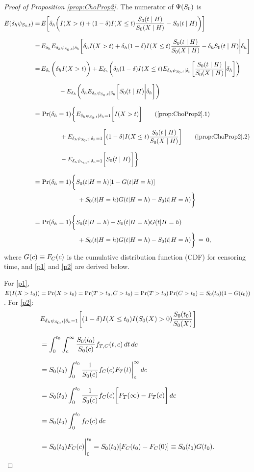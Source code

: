 {%
\newcommand{\termone}{I(X>t)}
\newcommand{\termtwo}{\omd I(X\leq t) \frac{\truesurv(t \mid H)}{\truesurv(X \mid H)}}
\newcommand{\termthree} {\truesurv(t \mid H)}
\newcommand{\estfunclongtrue}{\termone + \termtwo - \termthree}
\newcommand{\bigE}{E_{\unnormdirac\estfunctruesurvlabel\mid\unnormdirac}}
\newcommand{\bigEone}{E_{\unnormdirac\estfunctruesurvlabel\mid\unnormdirac = 1}}
\newcommand{\smallE}{E_{\unnormdirac}}
\begin{proof}[Proof of Proposition \ref{prop:ChoProp2}]
The numerator of $\Psi(S_0)$ is
\begin{align*}
E(\unnormdirac\estfunctruesurvlabel)
= &\,E\bigg[\unnormdirac \bigg( \estfunclongtrue\bigg)\bigg]  \eqnspace
= &\,\smallE \bigE\bigg[\unnormdirac \termone + \unnormdirac \termtwo - \unnormdirac \termthree \bigg| \unnormdirac \bigg]  \eqnspace
= &\,\smallE\bigg(\unnormdirac \termone \bigg) 
+ \smallE \bigg( \unnormdirac \omd I(X\leq t) \bigE \bigg[ \frac{\truesurv(t \mid H)}{\truesurv(X \mid H)} \bigg| \unnormdirac \bigg] \bigg) \eqnspace 
&\quad \quad \quad - \smallE \bigg(\unnormdirac \bigE \bigg[ \termthree\bigg|\unnormdirac\bigg]\bigg) \eqnspace
= &\,\Pr(\unnormdirac = 1) \bigg\{ 
\bigEone \bigg[ I(X>t) \bigg] \tag{\ref{prop:ChoProp2}.1} \label{p1} \eqnspace
&\,\quad \quad \quad + \bigEone \bigg[ \omd I(X\leq t) \frac{\truesurv(t \mid H)}{\truesurv(X \mid H)} \bigg] \tag{\ref{prop:ChoProp2}.2} \label{p2} \eqnspace
&\,\quad \quad \quad - \bigEone\bigg[ \termthree \bigg]
\bigg\} \eqnspace
=&\,\Pr(\unnormdirac = 1) \bigg\{ 
\truesurv(t|H=h)[1-G(t|H=h)] \\
&\quad \quad \quad \quad \quad \quad + \truesurv(t|H=h)G(t|H=h) - \truesurv(t|H=h)
\bigg\} \eqnspace
=&\,\Pr(\unnormdirac = 1) \bigg\{ 
\truesurv(t|H=h)-\truesurv(t|H=h)G(t|H=h) \\
&\quad \quad \quad \quad \quad \quad + \truesurv(t|H=h)G(t|H=h) - \truesurv(t|H=h)
\bigg\} \, = \,0,
\end{align*}
where $G(c) \equiv F_C(c)$ is the cumulative distribution function (CDF) for censoring time, and \cref{p1} and \cref{p2} are derived below. 
\newcommand{\tp}{t_0}

For \cref{p1}, $E(I(X>\tp)) = \Pr(X>\tp) = \Pr(T>\tp,C>\tp) = \Pr(T>\tp)\Pr(C>\tp) = \truesurv(\tp)(1-G(\tp))$. For \cref{p2}:
\begin{align*}
&\bigEone \bigg[(1-\delta) I(X\leq \tp)I(\truesurv(X)>0)\frac{\truesurv(\tp)}{\truesurv(X)}\bigg] \eqnspace 
&= \int_0^{\tp} \int_c^\infty \frac{\truesurv(\tp)}{\truesurv(c)} f_{T,C}(t,c)\,dt\,dc \eqnspace
&= \truesurv(\tp)\int_0^{\tp} \frac{1}{\truesurv(c)} f_{C}(c) F_T(t) \bigg|^\infty_c \,dc \eqnspace
&= \truesurv(\tp)\int_0^{\tp} 
\frac{1}{\truesurv(c)} f_{C}(c) \bigg[ F_T(\infty) - F_T(c) \bigg] \,dc \eqnspace
&= \truesurv(\tp)\int_0^{\tp} f_{C}(c) \,dc \eqnspace
&= \truesurv(\tp)F_{C}(c) \bigg|^{\tp}_0 = \truesurv(\tp)[F_C(\tp) - F_C(0)] \equiv \truesurv(\tp)G(\tp). 
\end{align*}
\end{proof}
}